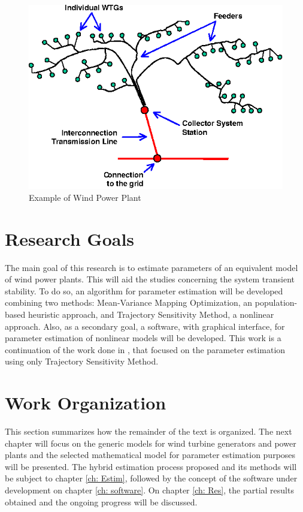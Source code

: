 \begin{figure}[h]
	\caption{Example of Wind Power Plant}
	\begin{center}
		\includegraphics[scale=1.25]{Images/WPP.eps}
	\end{center}
	\label{fig: WPP}
\end{figure}

\section{Research Goals}

The main goal of this research is to estimate parameters of an equivalent model of wind power plants. This will aid the studies concerning the system transient stability. To do so, an algorithm for parameter estimation will be developed combining two methods: Mean-Variance Mapping Optimization, an population-based heuristic approach, and Trajectory Sensitivity Method, a nonlinear approach. Also, as a secondary goal, a software, with graphical interface, for parameter estimation of nonlinear models will be developed. This work is a continuation of the work done in \cite{Cari2015}, that focused on the parameter estimation using only Trajectory Sensitivity Method.

\section{Work Organization}

This section summarizes how the remainder of the text is organized. The next chapter will focus on the generic models for wind turbine generators and power plants and the selected mathematical model for parameter estimation purposes will be presented. The hybrid estimation process proposed and its methods will be subject to chapter \ref{ch: Estim}, followed by the concept of the software under development on chapter \ref{ch: software}. On chapter \ref{ch: Res}, the partial results obtained and the ongoing progress will be discussed.